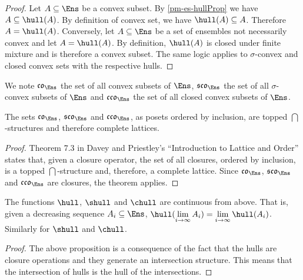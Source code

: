 \begin{mathSection}
\begin{proof}
	Let $A \subseteq \Ens$ be a convex subset. By \ref{pm-es-hullProp} we have $A \subseteq \hull(A)$. By definition of convex set, we have $\hull(A) \subseteq A$. Therefore $A = \hull(A)$. Conversely, let $A \subseteq \Ens$ be a set of ensembles not necessarily convex and let $A=\hull(A)$. By definition, $\hull(A)$ is closed under finite mixture and is therefore a convex subset. The same logic applies to $\sigma$-convex and closed convex sets with the respective hulls.
\end{proof}

\begin{defn}
	We note $\mathfrak{co}_{\Ens}$ the set of all convex subsets of $\Ens$, $\mathfrak{sco}_{\Ens}$ the set of all $\sigma$-convex subsets of $\Ens$ and $\mathfrak{cco}_{\Ens}$ the set of all closed convex subsets of $\Ens$.
\end{defn}

\begin{prop}
	The sets $\mathfrak{co}_{\Ens}$, $\mathfrak{sco}_{\Ens}$ and $\mathfrak{cco}_{\Ens}$, as posets ordered by inclusion, are topped $\bigcap$-structures and therefore complete lattices.
\end{prop}

\begin{proof}
	Theorem 7.3 in Davey and Priestley's ``Introduction to Lattice and Order'' states that, given a closure operator, the set of all closures, ordered by inclusion, is a topped $\bigcap$-structure and, therefore, a complete lattice. Since $\mathfrak{co}_{\Ens}$, $\mathfrak{sco}_{\Ens}$ and $\mathfrak{cco}_{\Ens}$ are closures, the theorem applies.
\end{proof}


\begin{prop}
	The functions $\hull$, $\shull$ and $\chull$ are continuous from above. That is, given a decreasing sequence $A_i \subseteq \Ens$, $\hull(\lim\limits_{i \to \infty} A_i) = \lim\limits_{i \to \infty} \hull(A_i)$. Similarly for $\shull$ and $\chull$.
\end{prop}

\begin{proof}
	The above proposition is a consequence of the fact that the hulls are closure operations and they generate an intersection structure. This means that the intersection of hulls is the hull of the intersections.
	

\end{proof}
\end{mathSection}
